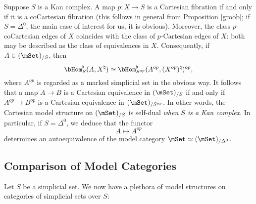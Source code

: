 \begin{remark}\label{duality}
Suppose $S$ is a Kan complex. A map $p: X \rightarrow S$ is a Cartesian fibration if and only if it is a coCartesian fibration (this follows in general from Proposition \ref{groob}; if $S = \Delta^0$, the main case of interest for us, it is obvious). Moreover, the class $p$-coCartesian edges of $X$ coincides with the class of $p$-Cartesian edges of $X$: both may be described as the class of equivalences in $X$. Consequently, if $A \in (\mSet)_{/S}$, then
$$ \bHom^{\flat}_{S}(A, X^{\natural}) \simeq \bHom^{\flat}_{S^{op}}(A^{op}, (X^{op})^{\natural})^{op},$$
where $A^{op}$ is regarded as a marked simplicial set in the obvious way. It follows that a map
$A \rightarrow B$ is a Cartesian equivalence in $(\mSet)_{/S}$ if and only if $A^{op} \rightarrow B^{op}$ is a Cartesian equivalence in $(\mSet)_{/S^{op}}$. In other words, the Cartesian model structure on $(\mSet)_{/S}$ is self-dual {\em when $S$ is a Kan complex}. In particular, if $S = \Delta^0$, we deduce that the functor $$ A \mapsto A^{op}$$ determines an autoequivalence of the model category $\mSet \simeq (\mSet)_{/\Delta^0}$.
\end{remark}

\subsection{Comparison of Model Categories}\label{compmodel}

Let $S$ be a simplicial set. We now have a plethora of model structures on categories of simplicial sets over $S$:

